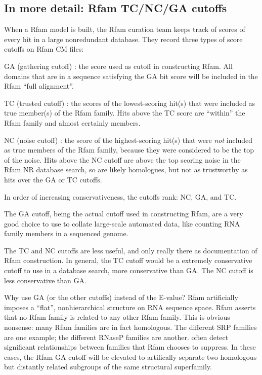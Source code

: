 \subsection{In more detail: Rfam TC/NC/GA cutoffs}

When a Rfam model is built, the Rfam curation team keeps track of
scores of every hit in a large nonredundant database. They record
three types of score cutoffs on Rfam CM files:

\begin{wideitem}
\item[GA (gathering cutoff)]: the score used as cutoff in
constructing Rfam. All domains that are in a sequence satisfying the
GA bit score will be included in the Rfam ``full alignment''.

\item[TC (trusted cutoff)]: the scores of the lowest-scoring hit(s)
that were included as true member(s) of the Rfam family. Hits above
the TC score are ``within'' the Rfam family and almost certainly
members.

\item[NC (noise cutoff)]: the score of the highest-scoring hit(s) that
were \textit{not} included as true members of the Rfam family, because
they were considered to be the top of the noise.  Hits above the NC
cutoff are above the top scoring noise in the Rfam NR database search,
so are likely homologues, but not as trustworthy as hits over the GA
or TC cutoffs.
\end{wideitem}

In order of increasing conservativeness, the cutoffs rank: NC, GA, and
TC.

The GA cutoff, being the actual cutoff used in constructing Rfam,
are a very good choice to use to collate large-scale automated data,
like counting RNA family members in a sequenced genome.

The TC and NC cutoffs are less useful, and only really there as
documentation of Rfam construction. In general, the TC cutoff would
be a extremely conservative cutoff to use in a database search, more
conservative than GA. The NC cutoff is less conservative than GA.

Why use GA (or the other cutoffs) instead of the E-value? Rfam
artificially imposes a ``flat'', nonhierarchical structure on RNA
sequence space.  Rfam asserts that no Rfam family is related to any
other Rfam family. This is obvious nonsense: many Rfam families are in
fact homologous.  The different SRP families are one example; the
different RNaseP families are another.  often
detect significant relationships between families that Rfam chooses to
suppress. In these cases, the Rfam GA cutoff will be elevated to
artifically separate two homologous but distantly related subgroups of
the same structural superfamily.

